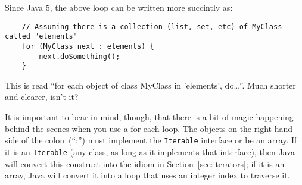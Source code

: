 Since Java 5, the above loop can be written more succintly as: 

\begin{verbatim}
    // Assuming there is a collection (list, set, etc) of MyClass called "elements"
    for (MyClass next : elements) {
        next.doSomething();
    }    
\end{verbatim}

This is read ``for each object of class MyClass in 'elements',
do\ldots''. Much shorter and clearer, isn't it? 

It is important to bear in mind, though,
that there is a bit of magic happening behind the scenes when you use
a for-each loop. The objects on the right-hand side of the
colon~(``:'') must implement the \verb+Iterable+ interface or be an
array. If it is an \verb+Iterable+ (any class, as long as it
implements that interface), then Java will convert this construct into
the idiom in Section~\ref{sec:iterators}; 
if it is an array, Java will convert it into a loop
that uses an integer index to traverse it. 



